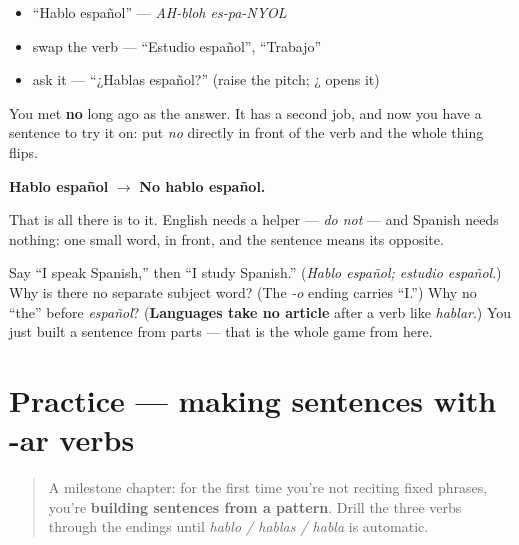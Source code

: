 \begin{itemize}
\raggedright
  \item \textquotedblleft{}Hablo español\textquotedblright{} — \emph{AH-bloh es-pa-NYOL}
  \item swap the verb — \textquotedblleft{}Estudio español\textquotedblright{}, \textquotedblleft{}Trabajo\textquotedblright{}
  \item ask it — \textquotedblleft{}¿Hablas español?\textquotedblright{} (raise the pitch; ¿ opens it)
\end{itemize}

\begin{culture}
You met \textbf{no} long ago as the answer. It has a second job, and now you have a sentence to try it on: put \emph{no} directly in front of the verb and the whole thing flips.

\textbf{Hablo español} $\to$ \textbf{No hablo español.}

That is all there is to it. English needs a helper — \emph{do not} — and Spanish needs nothing: one small word, in front, and the sentence means its opposite.
\end{culture}

\begin{tcolorbox}[breakable,colback=teal!4,colframe=teal!35!black,title={Before you move on}]
Say \textquotedblleft{}I speak Spanish,\textquotedblright{} then \textquotedblleft{}I study Spanish.\textquotedblright{} (\emph{Hablo español; estudio español}.) Why is there no separate subject word? (The \emph{-o} ending carries \textquotedblleft{}I.\textquotedblright{}) Why no \textquotedblleft{}the\textquotedblright{} before \emph{español}? (\textbf{Languages take no article} after a verb like \emph{hablar}.) You just built a sentence from parts — that is the whole game from here.
\end{tcolorbox}
\section[Practice]{Practice — making sentences with -ar verbs}

\label{lesson:ES-C06-practice}



\begin{quote}
A milestone chapter: for the first time you're not reciting fixed phrases, you're \textbf{building sentences from a pattern}. Drill the three verbs through the endings until \emph{hablo / hablas / habla} is automatic.
\end{quote}

